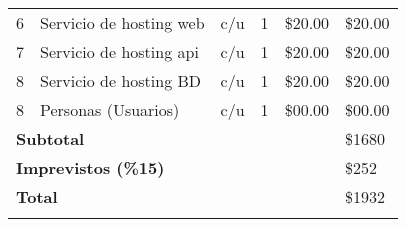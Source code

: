 \begin{ThreePartTable}
\begin{longtable}{|l |p{}| l| l| p{}| p{}|}
		6                                                 & Servicio de hosting web            & c/u             & 1                 & \$20.00                 & \$20.00              \\
		7                                                 & Servicio de hosting api            & c/u             & 1                 & \$20.00                 & \$20.00              \\
		8                                                 & Servicio de hosting BD             & c/u             & 1                 & \$20.00                 & \$20.00              \\
		8                                                 & Personas (Usuarios)                & c/u             & 1                 & \$00.00                 & \$00.00              \\
		\hline
		\multicolumn{5}{|l|}{\textbf{Subtotal}}           & \$1680                                                                                                                    \\
		\multicolumn{5}{|l|}{\textbf{Imprevistos (\%15)}} & \$252                                                                                                                     \\
		\multicolumn{5}{|l|}{\textbf{Total}}              & \$1932                                                                                                                    \\
		\hline
		\insertTableNotes
	\end{longtable}
\end{ThreePartTable}